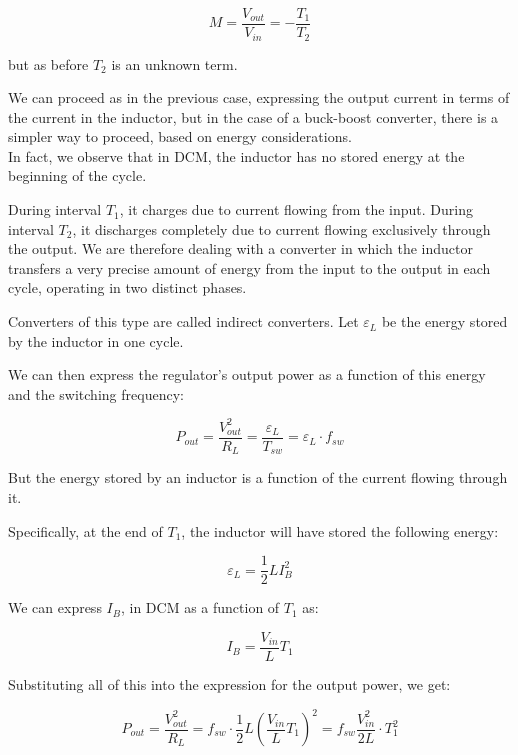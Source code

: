\documentclass[../main.tex]{subfiles}
\begin{document}
\begin{equation}
	M = \frac{V_{out}}{V_{in}} = - \frac{T_1}{T_2}
\end{equation}

but as before $T_2$ is an unknown term. 

We can proceed as in the previous case, expressing the output current in terms of the current in the inductor, but in the case of a buck-boost converter, there is a simpler way to proceed, based on energy considerations.\\

In fact, we observe that in DCM, the inductor has no stored energy at the beginning of the cycle. 

During interval $T_1$, it charges due to current flowing from the input. During interval $T_2$, it discharges completely due to current flowing exclusively through the output. We are therefore dealing with a converter in which the inductor transfers a very precise amount of energy from the input to the output in each cycle, operating in two distinct phases. 

Converters of this type are called indirect converters. Let $\varepsilon_L$ be the energy stored by the inductor in one cycle.

We can then express the regulator’s output power as a function of this energy and the switching frequency:

\begin{equation}
	P_{out} = \frac{V^2_{out}}{R_L} = \frac{\varepsilon_L}{T_{sw}} = \varepsilon_L \cdot f_{sw}
\end{equation}

But the energy stored by an inductor is a function of the current flowing through it. 

Specifically, at the end of $T_1$, the inductor will have stored the following energy:

\begin{equation}
	\varepsilon_L = \frac{1}{2}LI^2_B
\end{equation}

We can express $I_B$, in DCM as a function of $T_1$ as:

\begin{equation}
	I_B = \frac{V_{in}}{L}T_1
\end{equation}

Substituting all of this into the expression for the output power, we get:

\begin{equation}
	P_{out} = \frac{V^2_{out}}{R_L} = f_{sw} \cdot \frac{1}{2}L \left( \frac{V_{in}}{L} T_1 \right)^2 = f_{sw} \frac{V^2_{in}}{2L} \cdot T^2_1
\end{equation}
\end{document}
